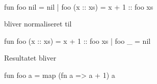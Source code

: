 \begin{example}\
\begin{sml}
fun foo nil       = nil
  | foo (x :: xs) = x + 1 :: foo xs
\end{sml}

bliver normaliseret til

\begin{sml}
fun foo (x :: xs) = x + 1 :: foo xs
  | foo _         = nil
\end{sml}

Resultatet bliver

\begin{sml}
fun foo a = map (fn a => a + 1) a
\end{sml}


  


    
    
    
        
        
      
        

\end{example}
